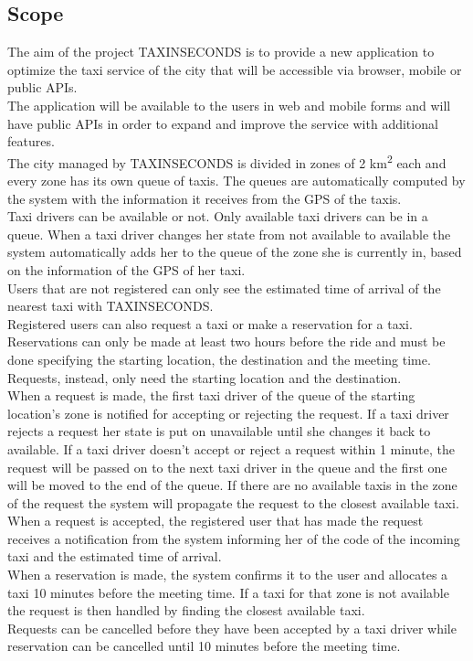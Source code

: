 \documentclass{article}
\begin{document}
\subsection{Scope}
The aim of the project TAXINSECONDS is to provide a new application to optimize the taxi service of the city that will be accessible via browser, mobile or public APIs.
\\The application will be available to the users in web and mobile forms and will have public APIs in order to expand and improve the service with additional features.
\\The city managed by TAXINSECONDS is divided in zones of 2 km\textsuperscript{2} each and every zone has its own queue of taxis. The queues are automatically computed by the system with the information it receives from the GPS of the taxis. 
\\Taxi drivers can be available or not. Only available taxi drivers can be in a queue. When a taxi driver changes her state from not available to available the system automatically adds her to the queue of the zone she is currently in, based on the information of the GPS of her taxi. 
\\Users that are not registered can only see the estimated time of arrival of the nearest taxi with TAXINSECONDS.\@
\\Registered users can also request a taxi or make a reservation for a taxi. Reservations can only be made at least two hours before the ride and must be done specifying the starting location, the destination and the meeting time. Requests, instead, only need the starting location and the destination.
\\When a request is made, the first taxi driver of the queue of the starting location's zone is notified for accepting or rejecting the request. If a taxi driver rejects a request her state is put on unavailable until she changes it back to available. If a taxi driver doesn't accept or reject a request within 1 minute, the request will be passed on to the next taxi driver in the queue and the first one will be moved to the end of the queue. If there are no available taxis in the zone of the request the system will propagate the request to the closest available taxi.
\\When a request is accepted, the registered user that has made the request receives a notification from the system informing her of the code of the incoming taxi and the estimated time of arrival.
\\When a reservation is made, the system confirms it to the user and allocates a taxi 10 minutes before the meeting time. If a taxi for that zone is not available the request is then handled by finding the closest available taxi.
\\Requests can be cancelled before they have been accepted by a taxi driver while reservation can be cancelled until 10 minutes before the meeting time.
\\%
\end{document}

